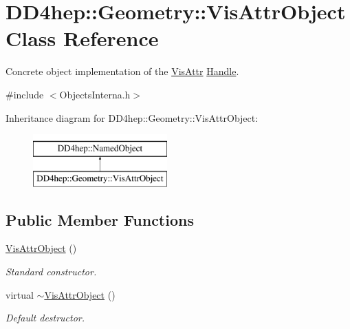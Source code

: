 \hypertarget{class_d_d4hep_1_1_geometry_1_1_vis_attr_object}{}\section{D\+D4hep\+:\+:Geometry\+:\+:Vis\+Attr\+Object Class Reference}
\label{class_d_d4hep_1_1_geometry_1_1_vis_attr_object}


Concrete object implementation of the \hyperlink{class_d_d4hep_1_1_geometry_1_1_vis_attr}{Vis\+Attr} \hyperlink{class_d_d4hep_1_1_handle}{Handle}.  




{\ttfamily \#include $<$Objects\+Interna.\+h$>$}

Inheritance diagram for D\+D4hep\+:\+:Geometry\+:\+:Vis\+Attr\+Object\+:\begin{figure}[H]
\begin{center}
\leavevmode
\includegraphics[height=2.000000cm]{class_d_d4hep_1_1_geometry_1_1_vis_attr_object}
\end{center}
\end{figure}
\subsection*{Public Member Functions}
\begin{DoxyCompactItemize}
\item 
\hyperlink{class_d_d4hep_1_1_geometry_1_1_vis_attr_object_ae88bf67cabcbfd4582037897a05f25bb}{Vis\+Attr\+Object} ()
\begin{DoxyCompactList}\small\item\em Standard constructor. \end{DoxyCompactList}\item 
virtual \hyperlink{class_d_d4hep_1_1_geometry_1_1_vis_attr_object_afd52e626a97e4ddcfb911f16fcef517b}{$\sim$\+Vis\+Attr\+Object} ()
\begin{DoxyCompactList}\small\item\em Default destructor. \end{DoxyCompactList}\end{DoxyCompactItemize}
